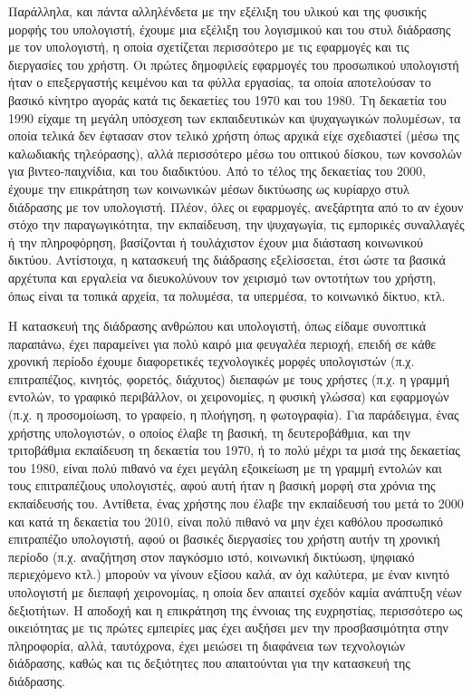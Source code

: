\documentclass[
]{article}
\begin{document}
Παράλληλα, και πάντα αλληλένδετα με την εξέλιξη του υλικού και της
φυσικής μορφής του υπολογιστή, έχουμε μια εξέλιξη του λογισμικού και του
στυλ διάδρασης με τον υπολογιστή, η οποία σχετίζεται περισσότερο με τις
εφαρμογές και τις διεργασίες του χρήστη. Οι πρώτες δημοφιλείς εφαρμογές
του προσωπικού υπολογιστή ήταν ο επεξεργαστής κειμένου και τα φύλλα
εργασίας, τα οποία αποτελούσαν το βασικό κίνητρο αγοράς κατά τις
δεκαετίες του 1970 και του 1980. Τη δεκαετία του 1990 είχαμε τη μεγάλη
υπόσχεση των εκπαιδευτικών και ψυχαγωγικών πολυμέσων, τα οποία τελικά
δεν έφτασαν στον τελικό χρήστη όπως αρχικά είχε σχεδιαστεί (μέσω της
καλωδιακής τηλεόρασης), αλλά περισσότερο μέσω του οπτικού δίσκου, των
κονσολών για βιντεο-παιχνίδια, και του διαδικτύου. Από το τέλος της
δεκαετίας του 2000, έχουμε την επικράτηση των κοινωνικών μέσων δικτύωσης
ως κυρίαρχο στυλ διάδρασης με τον υπολογιστή. Πλέον, όλες οι εφαρμογές,
ανεξάρτητα από το αν έχουν στόχο την παραγωγικότητα, την εκπαίδευση, την
ψυχαγωγία, τις εμπορικές συναλλαγές ή την πληροφόρηση, βασίζονται ή
τουλάχιστον έχουν μια διάσταση κοινωνικού δικτύου. Αντίστοιχα, η
κατασκευή της διάδρασης εξελίσσεται, έτσι ώστε τα βασικά αρχέτυπα και
εργαλεία να διευκολύνουν τον χειρισμό των οντοτήτων του χρήστη, όπως
είναι τα τοπικά αρχεία, τα πολυμέσα, τα υπερμέσα, το κοινωνικό δίκτυο,
κτλ.

Η κατασκευή της διάδρασης ανθρώπου και υπολογιστή, όπως είδαμε συνοπτικά
παραπάνω, έχει παραμείνει για πολύ καιρό μια φευγαλέα περιοχή, επειδή σε
κάθε χρονική περίοδο έχουμε διαφορετικές τεχνολογικές μορφές υπολογιστών
(π.χ. επιτραπέζιος, κινητός, φορετός, διάχυτος) διεπαφών με τους χρήστες
(π.χ. η γραμμή εντολών, το γραφικό περιβάλλον, οι χειρονομίες, η φυσική
γλώσσα) και εφαρμογών (π.χ. η προσομοίωση, το γραφείο, η πλοήγηση, η
φωτογραφία). Για παράδειγμα, ένας χρήστης υπολογιστών, ο οποίος έλαβε τη
βασική, τη δευτεροβάθμια, και την τριτοβάθμια εκπαίδευση τη δεκαετία του
1970, ή το πολύ μέχρι τα μισά της δεκαετίας του 1980, είναι πολύ πιθανό
να έχει μεγάλη εξοικείωση με τη γραμμή εντολών και τους επιτραπέζιους
υπολογιστές, αφού αυτή ήταν η βασική μορφή στα χρόνια της εκπαίδευσής
του. Αντίθετα, ένας χρήστης που έλαβε την εκπαίδευσή του μετά το 2000
και κατά τη δεκαετία του 2010, είναι πολύ πιθανό να μην έχει καθόλου
προσωπικό επιτραπέζιο υπολογιστή, αφού οι βασικές διεργασίες του χρήστη
αυτήν τη χρονική περίοδο (π.χ. αναζήτηση στον παγκόσμιο ιστό, κοινωνική
δικτύωση, ψηφιακό περιεχόμενο κτλ.) μπορούν να γίνουν εξίσου καλά, αν
όχι καλύτερα, με έναν κινητό υπολογιστή με διεπαφή χειρονομίας, η οποία
δεν απαιτεί σχεδόν καμία ανάπτυξη νέων δεξιοτήτων. Η αποδοχή και η
επικράτηση της έννοιας της ευχρηστίας, περισσότερο ως οικειότητας με τις
πρώτες εμπειρίες μας έχει αυξήσει μεν την προσβασιμότητα στην
πληροφορία, αλλά, ταυτόχρονα, έχει μειώσει τη διαφάνεια των τεχνολογιών
διάδρασης, καθώς και τις δεξιότητες που απαιτούνται για την κατασκευή
της διάδρασης.
\end{document}
